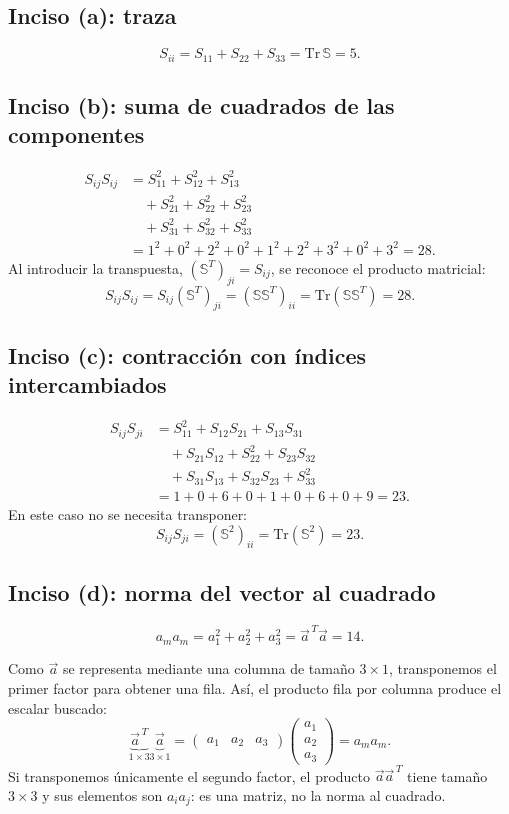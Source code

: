 \subsection*{Inciso (a): traza}
\[
S_{ii}=S_{11}+S_{22}+S_{33}
=\mathrm{Tr}\,\mathbb S=\boxed{5}.
\]

\subsection*{Inciso (b): suma de cuadrados de las componentes}
\[
\begin{aligned}
S_{ij}S_{ij}
&=S_{11}^2+S_{12}^2+S_{13}^2\\
&\quad+S_{21}^2+S_{22}^2+S_{23}^2\\
&\quad+S_{31}^2+S_{32}^2+S_{33}^2\\
&=1^2+0^2+2^2+0^2+1^2+2^2+3^2+0^2+3^2=28.
\end{aligned}
\]
Al introducir la transpuesta, $(\mathbb S^T)_{ji}=S_{ij}$, se reconoce el producto matricial:
\[
S_{ij}S_{ij}=S_{ij}(\mathbb S^T)_{ji}
=(\mathbb S\mathbb S^T)_{ii}
=\mathrm{Tr}(\mathbb S\mathbb S^T)=\boxed{28}.
\]

\subsection*{Inciso (c): contracción con índices intercambiados}
\[
\begin{aligned}
S_{ij}S_{ji}
&=S_{11}^2+S_{12}S_{21}+S_{13}S_{31}\\
&\quad+S_{21}S_{12}+S_{22}^2+S_{23}S_{32}\\
&\quad+S_{31}S_{13}+S_{32}S_{23}+S_{33}^2\\
&=1+0+6+0+1+0+6+0+9=23.
\end{aligned}
\]
En este caso no se necesita transponer:
\[
S_{ij}S_{ji}=(\mathbb S^2)_{ii}
=\mathrm{Tr}(\mathbb S^2)=\boxed{23}.
\]

\subsection*{Inciso (d): norma del vector al cuadrado}
\[
a_ma_m=a_1^2+a_2^2+a_3^2
=\vec a^{\,T}\vec a=\boxed{14}.
\]

Como $\vec a$ se representa mediante una columna de tamaño $3\times1$, transponemos el primer factor para obtener una fila. Así, el producto fila por columna produce el escalar buscado:
\[
\underbrace{\vec a^{\,T}}_{1\times3}
\underbrace{\vec a}_{3\times1}
=\begin{pmatrix}a_1&a_2&a_3\end{pmatrix}
\begin{pmatrix}a_1\\a_2\\a_3\end{pmatrix}
=a_ma_m.
\]
Si transponemos únicamente el segundo factor, el producto $\vec a\vec a^{\,T}$ tiene tamaño $3\times3$ y sus elementos son $a_i a_j$: es una matriz, no la norma al cuadrado.


